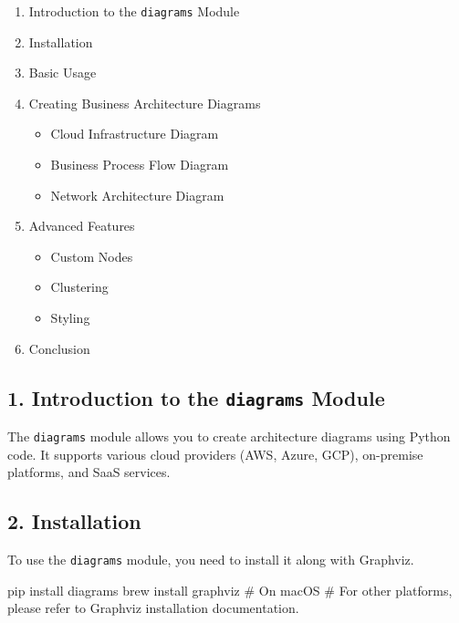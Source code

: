 \documentclass[
  letterpaper,
  DIV=11,
  numbers=noendperiod]{scrreprt}
\newenvironment{Shaded}{\begin{snugshade}}{\end{snugshade}}
\newcommand{\CommentTok}[1]{\textcolor[rgb]{0.37,0.37,0.37}{#1}}
\newcommand{\ExtensionTok}[1]{\textcolor[rgb]{0.00,0.23,0.31}{#1}}
\newcommand{\NormalTok}[1]{\textcolor[rgb]{0.00,0.23,0.31}{#1}}
\providecommand{\tightlist}{%
  \setlength{\itemsep}{0pt}\setlength{\parskip}{0pt}}\usepackage{longtable,booktabs,array}
\begin{document}
\begin{enumerate}
\def\labelenumi{\arabic{enumi}.}
\tightlist
\item
  Introduction to the \texttt{diagrams} Module
\item
  Installation
\item
  Basic Usage
\item
  Creating Business Architecture Diagrams

  \begin{itemize}
  \tightlist
  \item
    Cloud Infrastructure Diagram
  \item
    Business Process Flow Diagram
  \item
    Network Architecture Diagram
  \end{itemize}
\item
  Advanced Features

  \begin{itemize}
  \tightlist
  \item
    Custom Nodes
  \item
    Clustering
  \item
    Styling
  \end{itemize}
\item
  Conclusion
\end{enumerate}

\subsection{\texorpdfstring{1. Introduction to the \texttt{diagrams}
Module}{1. Introduction to the diagrams Module}}\label{introduction-to-the-diagrams-module}

The \texttt{diagrams} module allows you to create architecture diagrams
using Python code. It supports various cloud providers (AWS, Azure,
GCP), on-premise platforms, and SaaS services.

\subsection{2. Installation}\label{installation}

To use the \texttt{diagrams} module, you need to install it along with
Graphviz.

\begin{Shaded}
\begin{Highlighting}[]
\ExtensionTok{pip}\NormalTok{ install diagrams}
\ExtensionTok{brew}\NormalTok{ install graphviz  }\CommentTok{\# On macOS}
\CommentTok{\# For other platforms, please refer to Graphviz installation documentation.}
\end{Highlighting}
\end{Shaded}
\end{document}
